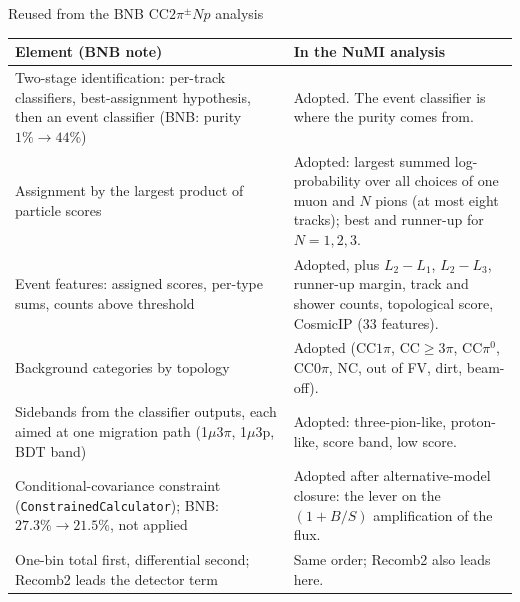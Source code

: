 \documentclass[aspectratio=169,10pt]{beamer}
\begin{document}
\begin{frame}{Reused from the BNB CC$2\pi^\pm Np$ analysis}
  \scriptsize\renewcommand{\arraystretch}{1.05}
  \begin{tabular}{>{\raggedright\arraybackslash}p{}>{\raggedright\arraybackslash}p{}}
    \toprule
    Element (BNB note) & In the NuMI analysis \\
    \midrule
    Two-stage identification: per-track classifiers, best-assignment hypothesis, then an event
    classifier (BNB: purity $1\%\to44\%$) &
    Adopted. The event classifier is where the purity comes from. \\
    Assignment by the largest product of particle scores &
    Adopted: largest summed log-probability over all choices of one muon and $N$ pions (at most eight
    tracks); best and runner-up for $N=1,2,3$. \\
    Event features: assigned scores, per-type sums, counts above threshold &
    Adopted, plus $L_2-L_1$, $L_2-L_3$, runner-up margin, track and shower counts, topological score,
    CosmicIP (33 features). \\
    Background categories by topology &
    Adopted (CC$1\pi$, CC$\geq3\pi$, CC$\pi^0$, CC$0\pi$, NC, out of FV, dirt, beam-off). \\
    Sidebands from the classifier outputs, each aimed at one migration path (1$\mu$3$\pi$, 1$\mu$3p,
    BDT band) &
    Adopted: three-pion-like, proton-like, score band, low score. \\
    Conditional-covariance constraint (\texttt{ConstrainedCalculator}); BNB: $27.3\%\to21.5\%$, not applied &
    Adopted after alternative-model closure: the lever on the $(1+B/S)$ amplification of the flux. \\
    One-bin total first, differential second; Recomb2 leads the detector term &
    Same order; Recomb2 also leads here. \\
    \bottomrule
  \end{tabular}
\end{frame}
\end{document}

